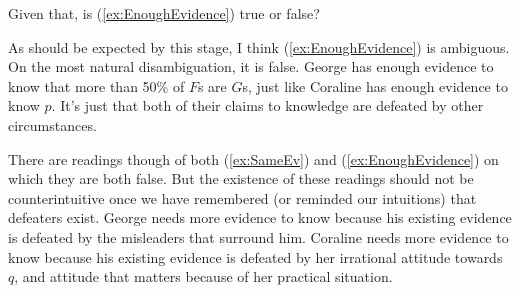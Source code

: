 Given that, is (\ref{ex:EnoughEvidence}) true or false?


\noindent As should be expected by this stage, I think (\ref{ex:EnoughEvidence}) is ambiguous. On the most natural disambiguation, it is false. George has enough evidence to know that more than 50\% of \(F\)s are \(G\)s, just like Coraline has enough evidence to know \(p\). It's just that both of their claims to knowledge are defeated by other circumstances.

There are readings though of both (\ref{ex:SameEv}) and (\ref{ex:EnoughEvidence}) on which they are both false. But the existence of these readings should not be counterintuitive once we have remembered (or reminded our intuitions) that defeaters exist. George needs more evidence to know because his existing evidence is defeated by the misleaders that surround him. Coraline needs more evidence to know because his existing evidence is defeated by her irrational attitude towards \(q\), and attitude that matters because of her practical situation. 